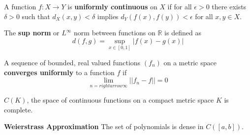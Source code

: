 \documentclass[12pt]{article}
\begin{document}
A function $f : X \rightarrow Y$ is \textbf{uniformly continuous} on $X$ if 
for all $\epsilon > 0$ there exists $\delta > 0$ such that $d_X(x, y) <
\delta$ implies $d_Y(f(x), f(y)) < \epsilon$ for all $x, y \in X$. 

The \textbf{sup norm} or $L^\infty$ norm between functions on $\mathbb{R}$
is defined as
\[
    d(f, g) = \sup_{x \in [0, 1]} |f(x) - g(x)|
\]

A sequence of bounded, real valued functions $(f_n)$ on a metric space
\textbf{converges uniformly} to a function $f$ if
\[
    \lim_{n =rightarrow \infty} || f_n -f || = 0
\]

$C(K)$, the space of continuous functions on a compact metric space $K$ is
complete.

\textbf{Weierstrass Approximation} The set of polynomials is dense in
$C([a, b])$.
\end{document}
